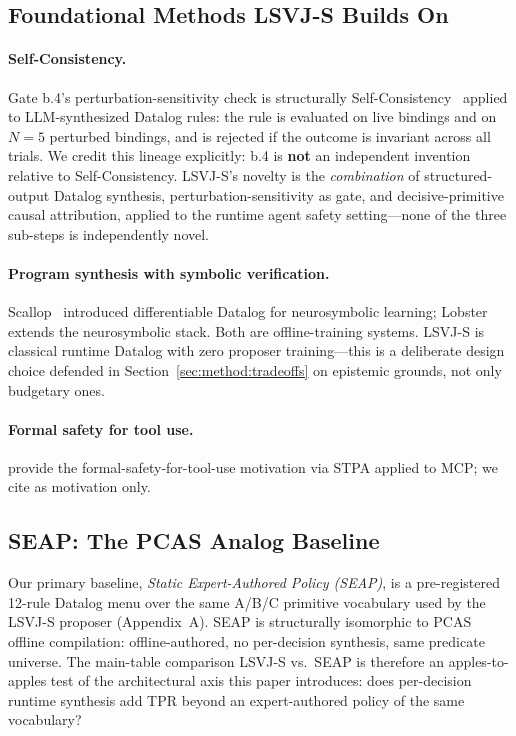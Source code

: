 \documentclass{article}
\theoremstyle{definition}
\begin{document}
\subsection{Foundational Methods LSVJ-S Builds On}

\paragraph{Self-Consistency.}
Gate b.4's perturbation-sensitivity check is structurally
Self-Consistency~\citep{wang2022selfconsistency} applied to
LLM-synthesized Datalog rules: the rule is evaluated on live bindings
and on $N{=}5$ perturbed bindings, and is rejected if the outcome is
invariant across all trials. We credit this lineage explicitly: b.4
is \textbf{not} an independent invention relative to Self-Consistency.
LSVJ-S's novelty is the \emph{combination} of structured-output
Datalog synthesis, perturbation-sensitivity as gate, and
decisive-primitive causal attribution, applied to the runtime agent
safety setting---none of the three sub-steps is independently novel.

\paragraph{Program synthesis with symbolic verification.}
Scallop~\citep{li2023scallop} introduced differentiable Datalog for
neurosymbolic learning; Lobster~\citep{lobster2026} extends the
neurosymbolic stack. Both are offline-training systems. LSVJ-S is
classical runtime Datalog with zero proposer training---this is a
deliberate design choice defended in Section~\ref{sec:method:tradeoffs}
on epistemic grounds, not only budgetary ones.

\paragraph{Formal safety for tool use.}
\citet{doshi2026verifiable} provide the formal-safety-for-tool-use
motivation via STPA applied to MCP; we cite as motivation only.

\subsection{SEAP: The PCAS Analog Baseline}
Our primary baseline, \emph{Static Expert-Authored Policy (SEAP)}, is
a pre-registered 12-rule Datalog menu over the same A/B/C primitive
vocabulary used by the LSVJ-S proposer (Appendix~A). SEAP is
structurally isomorphic to PCAS offline compilation: offline-authored,
no per-decision synthesis, same predicate universe. The main-table
comparison LSVJ-S vs.\ SEAP is therefore an apples-to-apples test of
the architectural axis this paper introduces: does per-decision
runtime synthesis add TPR beyond an expert-authored policy of the
same vocabulary?
\end{document}
